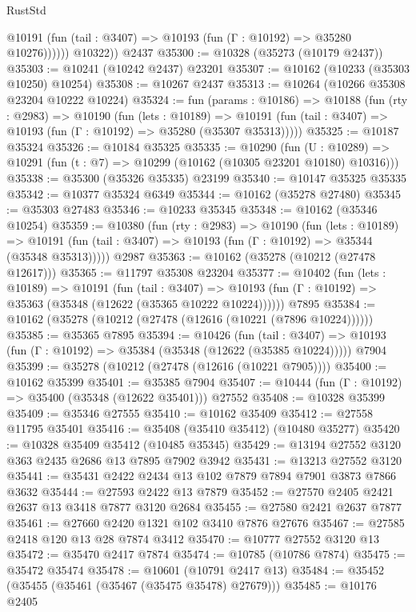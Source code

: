 \begin{lexlean}{RustStd}
\begin{coremodule}
              @10191 (fun (tail : @3407) => @10193 (fun (Γ : @10192) => @35280 @10276))))))
        @10322))
    @2437
@35300 := @10328 (@35273 (@10179 @2437))
@35303 := @10241 (@10242 @2437) @23201
@35307 := @10162 (@10233 (@35303 @10250) @10254)
@35308 := @10267 @2437
@35313 := @10264 (@10266 @35308 @23204 @10222 @10224)
@35324 := fun (params : @10186) =>
  @10188
    (fun (rty : @2983) =>
    @10190
      (fun (lets : @10189) =>
      @10191 (fun (tail : @3407) => @10193 (fun (Γ : @10192) => @35280 (@35307 @35313)))))
@35325 := @10187 @35324
@35326 := @10184 @35325
@35335 := @10290
    (fun (U : @10289) => @10291 (fun (t : @7) => @10299 (@10162 (@10305 @23201 @10180) @10316)))
@35338 := @35300 (@35326 @35335) @23199
@35340 := @10147 @35325 @35335
@35342 := @10377 @35324 @6349
@35344 := @10162 (@35278 @27480)
@35345 := @35303 @27483
@35346 := @10233 @35345
@35348 := @10162 (@35346 @10254)
@35359 := @10380
    (fun (rty : @2983) =>
    @10190
      (fun (lets : @10189) =>
      @10191 (fun (tail : @3407) => @10193 (fun (Γ : @10192) => @35344 (@35348 @35313)))))
    @2987
@35363 := @10162 (@35278 (@10212 (@27478 @12617)))
@35365 := @11797 @35308 @23204
@35377 := @10402
    (fun (lets : @10189) =>
    @10191
      (fun (tail : @3407) =>
      @10193 (fun (Γ : @10192) => @35363 (@35348 (@12622 (@35365 @10222 @10224))))))
    @7895
@35384 := @10162 (@35278 (@10212 (@27478 (@12616 (@10221 (@7896 @10224))))))
@35385 := @35365 @7895
@35394 := @10426
    (fun (tail : @3407) => @10193 (fun (Γ : @10192) => @35384 (@35348 (@12622 (@35385 @10224)))))
    @7904
@35399 := @35278 (@10212 (@27478 (@12616 (@10221 @7905))))
@35400 := @10162 @35399
@35401 := @35385 @7904
@35407 := @10444 (fun (Γ : @10192) => @35400 (@35348 (@12622 @35401))) @27552
@35408 := @10328 @35399
@35409 := @35346 @27555
@35410 := @10162 @35409
@35412 := @27558 @11795 @35401
@35416 := @35408 (@35410 @35412) (@10480 @35277)
@35420 := @10328 @35409 @35412 (@10485 @35345)
@35429 := @13194 @27552 @3120 @363 @2435 @2686 @13 @7895 @7902 @3942
@35431 := @13213 @27552 @3120
@35441 := @35431 @2422 @2434 @13 @102 @7879 @7894 @7901 @3873 @7866 @3632
@35444 := @27593 @2422 @13 @7879
@35452 := @27570 @2405 @2421 @2637 @13 @3418 @7877 @3120 @2684
@35455 := @27580 @2421 @2637 @7877
@35461 := @27660 @2420 @1321 @102 @3410 @7876 @27676
@35467 := @27585 @2418 @120 @13 @28 @7874 @3412
@35470 := @10777 @27552 @3120 @13
@35472 := @35470 @2417 @7874
@35474 := @10785 (@10786 @7874)
@35475 := @35472 @35474
@35478 := @10601 (@10791 @2417 @13)
@35484 := @35452 (@35455 (@35461 (@35467 (@35475 @35478) @27679)))
@35485 := @10176 @2405

\end{coremodule}
\end{lexlean}
